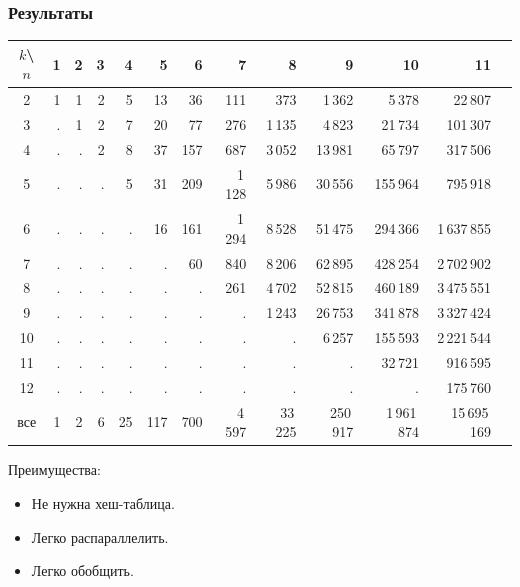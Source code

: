 \documentclass[dvips, intlimits, 9pt, unicode, notheorems]{beamer}
\theoremstyle{plain}
\theoremstyle{definition}
\begin{document}
	\begin{frame}
		\frametitle{Результаты}

		\begin{table}[ht]
		{
			\tiny
			\centering
			\begin{tabular}{|c||r|r|r|r|r|r|r|r|r|r|r|r|}
			\hline
			$k$\textbackslash $n$
			    & 1 & 2 & 3 &  4 &   5 &   6 &      7 &       8 &        9 &          10 &           11 \\
			\hline\hline
			2   & 1 & 1 & 2 &  5 &  13 &  36 &    111 &     373 &   1\,362 &      5\,378 &      22\,807 \\
			3   & . & 1 & 2 &  7 &  20 &  77 &    276 &  1\,135 &   4\,823 &     21\,734 &     101\,307 \\
			4   & . & . & 2 &  8 &  37 & 157 &    687 &  3\,052 &  13\,981 &     65\,797 &     317\,506 \\
			5   & . & . & . &  5 &  31 & 209 & 1\,128 &  5\,986 &  30\,556 &    155\,964 &     795\,918 \\
			6   & . & . & . &  . &  16 & 161 & 1\,294 &  8\,528 &  51\,475 &    294\,366 &  1\,637\,855 \\
			7   & . & . & . &  . &   . &  60 &    840 &  8\,206 &  62\,895 &    428\,254 &  2\,702\,902 \\
			8   & . & . & . &  . &   . &   . &    261 &  4\,702 &  52\,815 &    460\,189 &  3\,475\,551 \\
			9   & . & . & . &  . &   . &   . &      . &  1\,243 &  26\,753 &    341\,878 &  3\,327\,424 \\
			10  & . & . & . &  . &   . &   . &      . &       . &   6\,257 &    155\,593 &  2\,221\,544 \\
			11  & . & . & . &  . &   . &   . &      . &       . &        . &     32\,721 &     916\,595 \\
			12  & . & . & . &  . &   . &   . &      . &       . &        . &           . &     175\,760 \\
			\hline
			все & 1 & 2 & 6 & 25 & 117 & 700 & 4\,597 & 33\,225 & 250\,917 & 1\,961\,874 & 15\,695\,169 \\
			\hline
			\end{tabular}
		}
		\end{table}

		Преимущества:
		\begin{itemize}
			\item Не нужна хеш-таблица.
			\item Легко распараллелить.
			\item Легко обобщить.
		\end{itemize}
	\end{frame}
\end{document}
